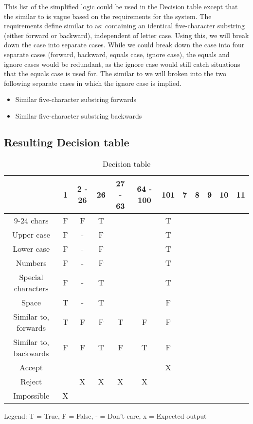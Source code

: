\documentclass[12pt,letterpaper]{article}
\begin{document}
This list of the simplified logic could be used in the Decision table except that the similar to is vague based on the
requirements for the system. The requirements define similar to as: containing an identical five-character
substring (either forward or backward), independent of letter case.
Using this, we will break down the case into separate cases. While we could break down the case into
four separate cases (forward, backward, equals case, ignore case), the equals and
ignore cases would be redundant, as the ignore case would still catch situations that the equals
case is used for. The similar to we will broken into the two following separate cases in which the ignore case is implied.
\begin{itemize}
\item Similar five-character substring forwards
\item Similar five-character substring backwards
\end{itemize}

\subsection{Resulting Decision table}

\begin{table}[h]
  \begin{center}
    \caption{Decision table}
    \label{tab:Decision table}
    
    \begin{tabular}{c|c|c|c|c|c|c|c|c|c|c|c|}
    & 1 & 2 - 26 & 26 & 27 - 63 & 64 - 100 & 101 & 7 & 8 & 9 & 10 & 11 \\
    \hline
    9-24 chars & F & F & T &  &  & T & & & & & \\
    \hline
    Upper case & F & - & F &  &  & T & & & & & \\
    \hline
    Lower case & F & - & F &  &  & T & & & & & \\
    \hline
    Numbers & F & - & F &  &  & T & & & & & \\
    \hline
    Special characters & F & - & T &  &  & T & & & & & \\
    \hline
    Space & T & - & T &  &  & F & & & & & \\
    \hline 
    Similar to, forwards & T & F & F & T & F & F & & & & & \\
    \hline
    Similar to, backwards & F & F & T & F & T & F & & & & & \\
    \midrule
    Accept & & & & & & X & & & & & \\
    \hline
    Reject & & X & X & X & X & & & & & & \\
    \hline
    Impossible & X & & & & & & & & & & \\
    \end{tabular}
    
    Legend: T = True, F = False, - = Don't care, x = Expected output
  \end{center}
\end{table}
\end{document}
